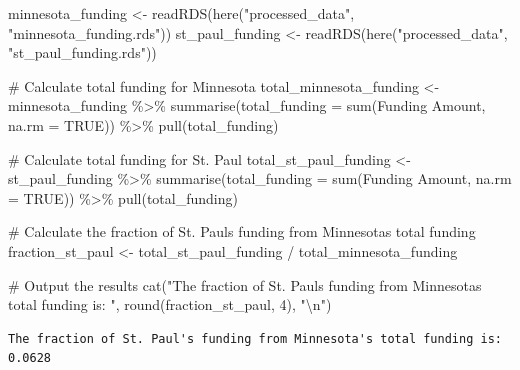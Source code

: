 \documentclass[
  letterpaper,
  DIV=11,
  numbers=noendperiod]{scrartcl}
\newenvironment{Shaded}{\begin{snugshade}}{\end{snugshade}}
\newcommand{\AttributeTok}[1]{\textcolor[rgb]{0.40,0.45,0.13}{#1}}
\newcommand{\CommentTok}[1]{\textcolor[rgb]{0.37,0.37,0.37}{#1}}
\newcommand{\ConstantTok}[1]{\textcolor[rgb]{0.56,0.35,0.01}{#1}}
\newcommand{\DecValTok}[1]{\textcolor[rgb]{0.68,0.00,0.00}{#1}}
\newcommand{\FunctionTok}[1]{\textcolor[rgb]{0.28,0.35,0.67}{#1}}
\newcommand{\NormalTok}[1]{\textcolor[rgb]{0.00,0.23,0.31}{#1}}
\newcommand{\OtherTok}[1]{\textcolor[rgb]{0.00,0.23,0.31}{#1}}
\newcommand{\SpecialCharTok}[1]{\textcolor[rgb]{0.37,0.37,0.37}{#1}}
\newcommand{\StringTok}[1]{\textcolor[rgb]{0.13,0.47,0.30}{#1}}
\begin{document}
\begin{Shaded}
\begin{Highlighting}[]
\NormalTok{minnesota\_funding }\OtherTok{\textless{}{-}} \FunctionTok{readRDS}\NormalTok{(}\FunctionTok{here}\NormalTok{(}\StringTok{"processed\_data"}\NormalTok{, }\StringTok{"minnesota\_funding.rds"}\NormalTok{))}
\NormalTok{st\_paul\_funding }\OtherTok{\textless{}{-}} \FunctionTok{readRDS}\NormalTok{(}\FunctionTok{here}\NormalTok{(}\StringTok{"processed\_data"}\NormalTok{, }\StringTok{"st\_paul\_funding.rds"}\NormalTok{))}

\CommentTok{\# Calculate total funding for Minnesota}
\NormalTok{total\_minnesota\_funding }\OtherTok{\textless{}{-}}\NormalTok{ minnesota\_funding }\SpecialCharTok{\%\textgreater{}\%}
  \FunctionTok{summarise}\NormalTok{(}\AttributeTok{total\_funding =} \FunctionTok{sum}\NormalTok{(}\StringTok{\textasciigrave{}}\AttributeTok{Funding Amount}\StringTok{\textasciigrave{}}\NormalTok{, }\AttributeTok{na.rm =} \ConstantTok{TRUE}\NormalTok{)) }\SpecialCharTok{\%\textgreater{}\%}
  \FunctionTok{pull}\NormalTok{(total\_funding)}

\CommentTok{\# Calculate total funding for St. Paul}
\NormalTok{total\_st\_paul\_funding }\OtherTok{\textless{}{-}}\NormalTok{ st\_paul\_funding }\SpecialCharTok{\%\textgreater{}\%}
  \FunctionTok{summarise}\NormalTok{(}\AttributeTok{total\_funding =} \FunctionTok{sum}\NormalTok{(}\StringTok{\textasciigrave{}}\AttributeTok{Funding Amount}\StringTok{\textasciigrave{}}\NormalTok{, }\AttributeTok{na.rm =} \ConstantTok{TRUE}\NormalTok{)) }\SpecialCharTok{\%\textgreater{}\%}
  \FunctionTok{pull}\NormalTok{(total\_funding)}

\CommentTok{\# Calculate the fraction of St. Paul\textquotesingle{}s funding from Minnesota\textquotesingle{}s total funding}
\NormalTok{fraction\_st\_paul }\OtherTok{\textless{}{-}}\NormalTok{ total\_st\_paul\_funding }\SpecialCharTok{/}\NormalTok{ total\_minnesota\_funding}

\CommentTok{\# Output the results}
\FunctionTok{cat}\NormalTok{(}\StringTok{"The fraction of St. Paul\textquotesingle{}s funding from Minnesota\textquotesingle{}s total funding is: "}\NormalTok{, }
    \FunctionTok{round}\NormalTok{(fraction\_st\_paul, }\DecValTok{4}\NormalTok{), }\StringTok{"}\SpecialCharTok{\textbackslash{}n}\StringTok{"}\NormalTok{)}
\end{Highlighting}
\end{Shaded}

\begin{verbatim}
The fraction of St. Paul's funding from Minnesota's total funding is:  0.0628 
\end{verbatim}
\end{document}

